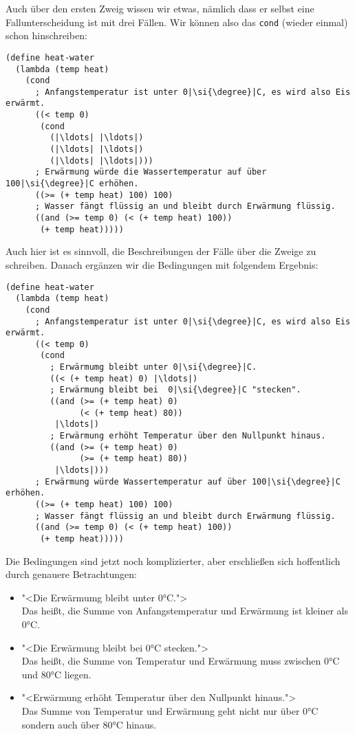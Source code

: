 \mantraschreib*
%
\noindent Auch über den ersten Zweig wissen wir etwas, nämlich dass er selbst
eine Fallunterscheidung ist mit drei Fällen.  Wir können also das
\lstinline{cond} (wieder einmal) schon hinschreiben:
%
\begin{lstlisting}
(define heat-water
  (lambda (temp heat)
    (cond
      ; Anfangstemperatur ist unter 0|\si{\degree}|C, es wird also Eis erwärmt.
      ((< temp 0)
       (cond
         (|\ldots| |\ldots|)
         (|\ldots| |\ldots|)
         (|\ldots| |\ldots|)))
      ; Erwärmung würde die Wassertemperatur auf über 100|\si{\degree}|C erhöhen.
      ((>= (+ temp heat) 100) 100)
      ; Wasser fängt flüssig an und bleibt durch Erwärmung flüssig.
      ((and (>= temp 0) (< (+ temp heat) 100))
       (+ temp heat)))))
\end{lstlisting}
%
Auch hier ist es sinnvoll, die Beschreibungen der Fälle über die
Zweige zu schreiben.  Danach ergänzen wir die Bedingungen mit
folgendem Ergebnis:
%
\begin{lstlisting}
(define heat-water
  (lambda (temp heat)
    (cond
      ; Anfangstemperatur ist unter 0|\si{\degree}|C, es wird also Eis erwärmt.
      ((< temp 0)
       (cond
         ; Erwärmumg bleibt unter 0|\si{\degree}|C.
         ((< (+ temp heat) 0) |\ldots|)
         ; Erwärmung bleibt bei  0|\si{\degree}|C "stecken".
         ((and (>= (+ temp heat) 0)
               (< (+ temp heat) 80))
          |\ldots|)
         ; Erwärmung erhöht Temperatur über den Nullpunkt hinaus.
         ((and (>= (+ temp heat) 0)
               (>= (+ temp heat) 80))
          |\ldots|)))
      ; Erwärmung würde Wassertemperatur auf über 100|\si{\degree}|C erhöhen.
      ((>= (+ temp heat) 100) 100)
      ; Wasser fängt flüssig an und bleibt durch Erwärmung flüssig.
      ((and (>= temp 0) (< (+ temp heat) 100))
       (+ temp heat)))))
\end{lstlisting}
%
Die Bedingungen sind jetzt noch komplizierter, aber erschließen sich
hoffentlich durch genauere Betrachtungen:
%
\begin{itemize}
\item "<Die Erwärmumg bleibt unter 0\si{\degree}C.">\\
  Das heißt, die Summe von
  Anfangstemperatur und Erwärmung ist kleiner als 0\si{\degree}C.
\item "<Die Erwärmung bleibt bei  0\si{\degree}C stecken.">\\
  Das heißt, die Summe von Temperatur und Erwärmung muss zwischen 0\si{\degree}C
  und 80\si{\degree}C liegen.
\item "<Erwärmung erhöht Temperatur über den Nullpunkt hinaus.">\\
  Das Summe von Temperatur und Erwärmung geht nicht nur über 0\si{\degree}C
  sondern auch über 80\si{\degree}C hinaus.
\end{itemize}

